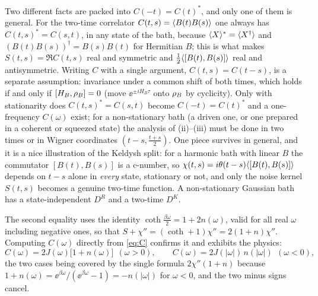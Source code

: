 \begin{remark}
Two different facts are packed into $C(-t)=C(t)^*$, and only one of them is general.
For the two-time correlator $C(t,s)=\langle B(t)B(s)\rangle$ one always has $C(t,s)^*=C(s,t)$, in any state of the bath, because $\langle X\rangle^*=\langle X^\dagger\rangle$ and $(B(t)B(s))^\dagger=B(s)B(t)$ for Hermitian $B$; this is what makes $S(t,s)=\Re C(t,s)$ real and symmetric and $\tfrac12\langle[B(t),B(s)]\rangle$ real and antisymmetric.
Writing $C$ with a single argument, $C(t,s)=C(t-s)$, is a separate assumption: invariance under a common shift of both times, which holds if and only if $[H_B,\rho_{B}]=0$ (move $\ee^{\pm iH_B\tau}$ onto $\rho_{B}$ by cyclicity).
Only with stationarity does $C(t,s)^*=C(s,t)$ become $C(-t)=C(t)^*$ and a one-frequency $C(\omega)$ exist; for a non-stationary bath (a driven one, or one prepared in a coherent or squeezed state) the analysis of (ii)--(iii) must be done in two times or in Wigner coordinates $(t-s,\tfrac{t+s}2)$.
One piece survives in general, and it is a nice illustration of the Keldysh split: for a harmonic bath with linear $B$ the commutator $[B(t),B(s)]$ is a c-number, so $\chi(t,s)=i\theta(t-s)\langle[B(t),B(s)]\rangle$ depends on $t-s$ alone in \emph{every} state, stationary or not, and only the noise kernel $S(t,s)$ becomes a genuine two-time function.
A non-stationary Gaussian bath has a state-independent $D^R$ and a two-time $D^K$.
\end{remark}

\noindent The second equality uses the identity $\coth\tfrac{\beta\omega}{2}=1+2n(\omega)$, valid for all real $\omega$ including negative ones, so that $S+\chi''=(\coth+1)\chi''=2(1+n)\chi''$.
Computing $C(\omega)$ directly from \cref{eq:C} confirms it and exhibits the physics:
\begin{equation}
  C(\omega)=2J(\omega)\big[1+n(\omega)\big]\ \ (\omega>0),\qquad
  C(\omega)=2J(|\omega|)\,n(|\omega|)\ \ (\omega<0),
  \label{eq:C-omega}
\end{equation}
the two cases being covered by the single formula $2\chi''(1+n)$ because $1+n(\omega)=\ee^{\beta\omega}/(\ee^{\beta\omega}-1)=-n(|\omega|)$ for $\omega<0$, and the two minus signs cancel.

